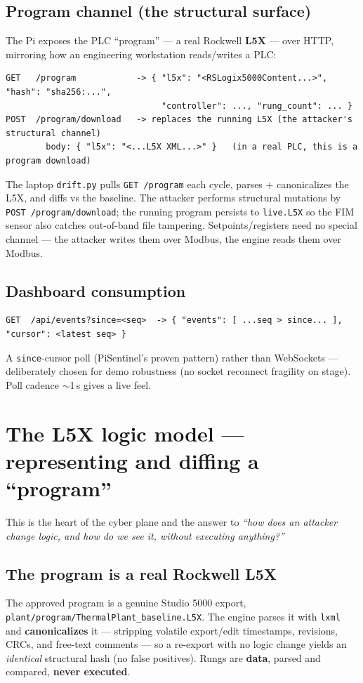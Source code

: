 \documentclass[11pt,a4paper]{article}
\newcommand{\code}[1]{\texttt{\small #1}}
\begin{document}
\subsection{Program channel (the structural surface)}
The Pi exposes the PLC ``program'' --- a real Rockwell \textbf{L5X} --- over HTTP, mirroring how an
engineering workstation reads/writes a PLC:

\begin{lstlisting}
GET   /program            -> { "l5x": "<RSLogix5000Content...>", "hash": "sha256:...",
                               "controller": ..., "rung_count": ... }
POST  /program/download   -> replaces the running L5X (the attacker's structural channel)
        body: { "l5x": "<...L5X XML...>" }   (in a real PLC, this is a program download)
\end{lstlisting}

The laptop \code{drift.py} pulls \code{GET /program} each cycle, parses + canonicalizes the L5X, and
diffs vs the baseline. The attacker performs structural mutations by \code{POST /program/download}; the
running program persists to \code{live.L5X} so the FIM sensor also catches out-of-band file tampering.
Setpoints/registers need no special channel --- the attacker writes them over Modbus, the engine reads
them over Modbus.

\subsection{Dashboard consumption}
\begin{lstlisting}
GET  /api/events?since=<seq>  -> { "events": [ ...seq > since... ], "cursor": <latest seq> }
\end{lstlisting}
A \code{since}-cursor poll (PiSentinel's proven pattern) rather than WebSockets --- deliberately
chosen for demo robustness (no socket reconnect fragility on stage). Poll cadence $\sim$1\,s gives a
live feel.

\section{The L5X logic model --- representing and diffing a ``program''}

This is the heart of the cyber plane and the answer to \emph{``how does an attacker change logic,
and how do we see it, without executing anything?''}

\subsection{The program is a real Rockwell L5X}
The approved program is a genuine Studio 5000 export,
\code{plant/program/ThermalPlant\_baseline.L5X}. The engine parses it with \code{lxml} and
\textbf{canonicalizes} it --- stripping volatile export/edit timestamps, revisions, CRCs, and free-text
comments --- so a re-export with no logic change yields an \emph{identical} structural hash (no false
positives). Rungs are \textbf{data}, parsed and compared, \textbf{never executed}.
\end{document}
